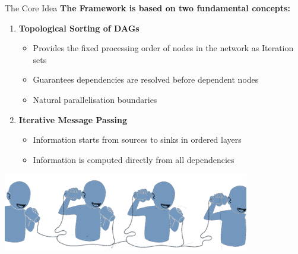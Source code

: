 \documentclass[aspectratio=169]{beamer}
\begin{document}
\begin{frame}{The Core Idea}
\textbf{The Framework is based on two fundamental concepts:}
\begin{enumerate}
\item \textbf{\textcolor{juliablue}{Topological Sorting of DAGs}}
\begin{itemize}
\item Provides the fixed processing order of nodes in the network as Iteration sets
\item Guarantees dependencies are resolved before dependent nodes
\item Natural parallelisation boundaries
\end{itemize}
\item \textbf{\textcolor{juliagreen}{Iterative Message Passing}}
\begin{itemize}
\item Information starts from sources to sinks in ordered layers
\item Information is computed directly from all dependencies 
\end{itemize}
\end{enumerate}

\vspace{0.2cm}
\begin{center}
\includegraphics[height=0.4\textheight]{msgpage.png}
\end{center}

\end{frame}
\end{document}
